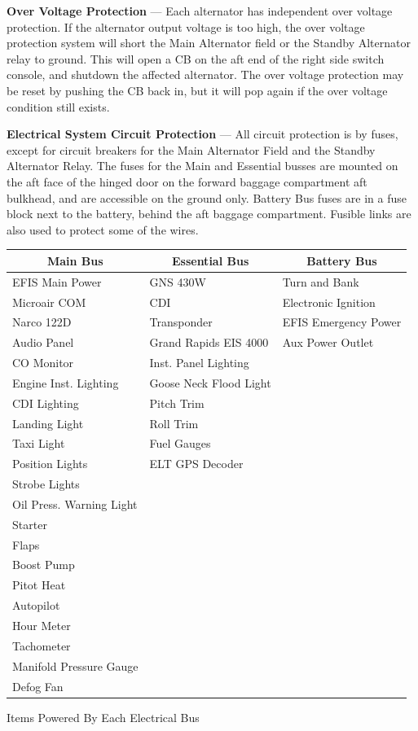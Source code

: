 \textbf{Over Voltage Protection} --- Each alternator has independent over voltage protection. If the alternator output voltage is too high, the over voltage protection system will short the Main Alternator field or the Standby Alternator relay to ground. This will open a CB on the aft end of the right side switch console, and shutdown the affected alternator. The over voltage protection may be reset by pushing the CB back in, but it will pop again if the over voltage condition still exists.

\textbf{Electrical System Circuit Protection} --- All circuit protection is by fuses, except for circuit breakers for the Main Alternator Field and the Standby Alternator Relay. The fuses for the Main and Essential busses are mounted on the aft face of the hinged door on the forward baggage compartment aft bulkhead, and are accessible on the ground only.  Battery Bus fuses are in a fuse block next to the battery, behind the aft baggage compartment. Fusible links are also used to protect some of the wires.

\begin{center}
\begin{tabular}
{|l|l|l|} \hline \multicolumn{1}{|c|}{Main Bus}& \multicolumn{1}{c|}{Essential Bus} & \multicolumn{1}{c|}{Battery Bus}\tabularnewline \hline \hline EFIS Main Power & GNS 430W & Turn and Bank\tabularnewline \hline Microair COM &CDI & Electronic Ignition\tabularnewline \hline Narco 122D & Transponder & EFIS Emergency Power\tabularnewline \hline Audio Panel &Grand Rapids EIS 4000 & Aux Power Outlet\tabularnewline \hline CO Monitor &Inst. Panel Lighting & \tabularnewline \hline Engine Inst. Lighting &Goose Neck Flood Light & \tabularnewline \hline CDI Lighting &Pitch Trim & \tabularnewline \hline Landing Light &Roll Trim & \tabularnewline \hline Taxi Light &Fuel Gauges & \tabularnewline \hline Position Lights &ELT GPS Decoder & \tabularnewline \hline Strobe Lights & & \tabularnewline \hline Oil Press. Warning Light & & \tabularnewline \hline Starter & & \tabularnewline \hline Flaps & & \tabularnewline \hline Boost Pump & & \tabularnewline \hline Pitot Heat & & \tabularnewline \hline Autopilot & & \tabularnewline \hline Hour Meter & & \tabularnewline \hline Tachometer & & \tabularnewline \hline Manifold Pressure Gauge & & \tabularnewline \hline Defog Fan & & \tabularnewline \hline 
\end{tabular}
\caption{Items Powered By Each Electrical Bus} 
\end{center}

